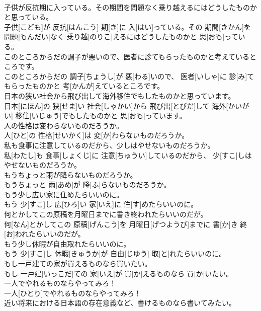 \documentclass[8pt]{extreport}
\begin{document}
\begin{CJK}{UTF8}{min}
\\	子供が反抗期に入っている。その期間を問題なく乗り越えるにはどうしたものかと思っている。	
\\	子供[こども]が 反抗[はんこう] 期[き]に 入[はい]っている。その 期間[きかん]を 問題[もんだい]なく 乗り越[のりこ]えるにはどうしたものかと 思[おも]っている。
\\	このところからだの調子が悪いので、医者に診てもらったものかと考えているところです。	
\\	このところからだの 調子[ちょうし]が 悪[わる]いので、 医者[いしゃ]に 診[み]てもらったものかと 考[かんが]えているところです。
\\	日本の狭い社会から飛び出して海外移住でもしたものかと思っています。	
\\	日本[にほん]の 狭[せま]い 社会[しゃかい]から 飛び出[とびだ]して 海外[かいがい] 移住[いじゅう]でもしたものかと 思[おも]っています。
\\	人の性格は変わらないものだろうか。	
\\	人[ひと]の 性格[せいかく]は 変[か]わらないものだろうか。
\\	私も食事に注意しているのだから、少しはやせないものだろうか。	
\\	私[わたし]も 食事[しょくじ]に 注意[ちゅうい]しているのだから、 少[すこ]しはやせないものだろうか。
\\	もうちょっと雨が降らないものだろうか。	
\\	もうちょっと 雨[あめ]が 降[ふ]らないものだろうか。
\\	もう少し広い家に住めたらいいのに。	
\\	もう 少[すこ]し 広[ひろ]い 家[いえ]に 住[す]めたらいいのに。
\\	何とかしてこの原稿を月曜日までに書き終われたらいいのだが。	
\\	何[なん]とかしてこの 原稿[げんこう]を 月曜日[げつようび]までに 書[か]き 終[お]われたらいいのだが。
\\	もう少し休暇が自由取れたらいいのに。	
\\	もう 少[すこ]し 休暇[きゅうか]が 自由[じゆう] 取[と]れたらいいのに。
\\	もし一戸建ての家が買えるものなら買いたい。	
\\	もし 一戸建[いっこだ]ての 家[いえ]が 買[か]えるものなら 買[か]いたい。
\\	一人でやれるものならやってみろ！	
\\	一人[ひとり]でやれるものならやってみろ！
\\	近い将来における日本語の存在意義など、書けるものなら書いてみたい。	

\end{CJK}
\end{document}
